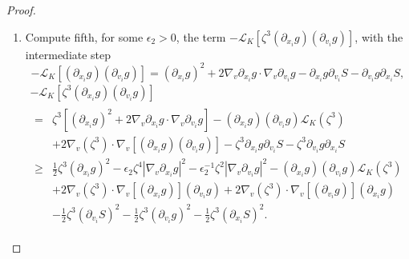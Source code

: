 \documentclass[10pt]{amsart}
\theoremstyle{definition}\newtheorem{defi}[theo]{Definition}\newtheorem{rema}[theo]{Remark}\newtheorem{exam}[theo]{Example}\newtheorem{exem}[theo]{Example}\newtheorem{nota}[theo]{Notation}
\newcommand{\cL}{\mathcal{L}}
\begin{document}
\begin{proof}
\begin{enumerate}
\item \label{proofprop3.1.v}Compute fifth, for some $\epsilon_2>0$, the term $-\cL_K [\zeta^3 (\partial_{x_i}g) (\partial_{v_i} g)]$, with the intermediate step
\[
- \cL_K \left[(\partial_{x_i} g)(\partial_{v_i} g)\right] = (\partial_{x_i} g)^2 + 2 \nabla_v \partial_{x_i} g \cdot \nabla_v \partial_{v_i} g -\partial_{x_i}g \partial_{v_i}S - \partial_{v_i} g \partial_{x_i}S,
\]
\begin{multline}\label{eq:barzeta}
- \cL_K \left[\zeta^3 (\partial_{x_i} g)\left(\partial_{v_i} g\right)\right]\\
\begin{aligned}
= &\zeta^3 \left[(\partial_{x_i} g)^2 + 2 \nabla_v \partial_{x_i} g \cdot \nabla_v \partial_{v_i} g
\right] - \left(\partial_{x_i}g\right)\left(\partial_{v_i} g\right) \cL_K (\zeta^3) \\
&+ 2 \nabla_v (\zeta^3) \cdot \nabla_v \left[(\partial_{x_i} g)(\partial_{v_i}g)\right] - \zeta^3 \partial_{x_i}g
\partial_{v_i}S - \zeta^3 \partial_{v_i}g \partial_{x_i}S \\
\ge & \frac12 \zeta^3 \left(\partial_{x_i} g\right)^2 - \epsilon_2 \zeta^4 \left|\nabla_v
\partial_{x_i}g\right|^2 - \epsilon_2^{-1} \zeta^2 \left|\nabla_v \partial_{v_i} g \right|^2
-(\partial_{x_i}g)(\partial_{v_i} g) \cL_K (\zeta^3) \\
& + 2 \nabla_v (\zeta^3) \cdot \nabla_v \left[(\partial_{x_i} g)\right] (\partial_{v_i}g) + 2 \nabla_v (\zeta^3) \cdot \nabla_v \left[(\partial_{v_i}g)\right] \left(\partial_{x_i} g\right) \\
& - \frac12 \zeta^3 \left(\partial_{v_i}S\right)^2 - \frac12 \zeta^3 \left(\partial_{v_i}g\right)^2 - \frac12 \zeta^3 \left(\partial_{x_i}S\right)^2.
\end{aligned}
\end{multline}
\end{enumerate}



\end{proof}
\end{document}
